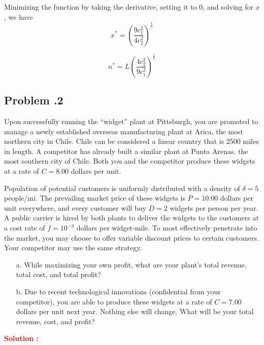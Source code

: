 \documentclass[12pt]{article}
\newcommand{\customsubsection}[1]{
  \subsection*{Problem \thesection.#1}
}
\begin{document}
Minimizing the function by taking the derivative, setting it to 0, and solving for $x$, we have
\[
x^* = \left( \frac{9c_1^2}{4c_2^2} \right)^{\frac{1}{5}}
\]

\[
n^* = L \left( \frac{4c_2^2}{9c_1^2}\right)^\frac{1}{5}
\]


\newpage

\customsubsection{2}
Upon successfully running the “widget” plant at Pittsburgh, you are promoted to manage a newly established overseas manufacturing plant at Arica, the most northern city in Chile. Chile can be considered a linear country that is 2500 miles in length. A competitor has already built a similar plant at Punta Arenas, the most southern city of Chile. Both you and the competitor produce these widgets at a rate of $C = 8.00$ dollars per unit.

Population of potential customers is uniformly distributed with a density of $\delta = 5$ people/mi. The prevailing market price of these widgets is $P = 10.00$ dollars per unit everywhere, and every customer will buy $D = 2$ widgets per person per year. A public carrier is hired by both plants to deliver the widgets to the customers at a cost rate of $f = 10^{-3}$ dollars per widget-mile. To most effectively penetrate into the market, you may choose to offer variable discount prices to certain customers. Your competitor may use the same strategy.

\begin{itemize}
    \item [a.]  While maximizing your own profit, what are your plant’s total revenue, total cost, and total profit?
    \item [b.]  Due to recent technological innovations (confidential from your competitor), you are able to produce these widgets at a rate of $C = 7.00$ dollars per unit next year. Nothing else will change. What will be your total revenue, cost, and profit?
\end{itemize}

\textbf{\textcolor{red}{Solution :}} 
\end{document}
